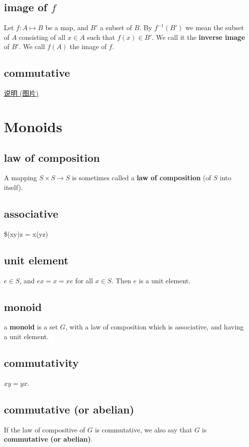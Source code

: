 \documentclass[11pt]{article}
\begin{document}
\subsection{image of \(f\)}
\label{sec:org735ef5c}
Let \(f:A\mapsto B\) be a map, and \(B'\) a subset of \(B\). By \(f^{-1}(B')\) we mean the subset
of \(A\) consisting of all \(x\in A\) such that \(f(x)\in B'\). We call it the \textbf{inverse image} of 
\(B'\). We call \(f(A)\) the image of \(f\).
\subsection{commutative}
\label{sec:orgd95ffef}
\href{./commutative.png}{说明 (图片)}
\section{Monoids}
\label{sec:org01803fb}
\subsection{law of composition}
\label{sec:org5745603}
A mapping \(S\times S \to S\) is sometimes called a \textbf{law of composition} (of \(S\) into itself).
\subsection{associative}
\label{sec:orgf827124}
\$(xy)z = x(yz)
\subsection{unit element}
\label{sec:orga2597c1}
\(e\in S\), and \(ex = x = xe\) for all \(x\in S\). Then \(e\) is a unit element.
\subsection{monoid}
\label{sec:org40edaf2}
a \textbf{monoid} is a set \(G\), with a law of composition which is associative, and having a unit element.
\subsection{commutativity}
\label{sec:org6f579e7}
\(xy = yx\).
\subsection{commutative (or abelian)}
\label{sec:org0c3708e}
If the law of compositive of \(G\) is commutative, we also say that \(G\) is \textbf{commutative (or abelian)}.
\end{document}
